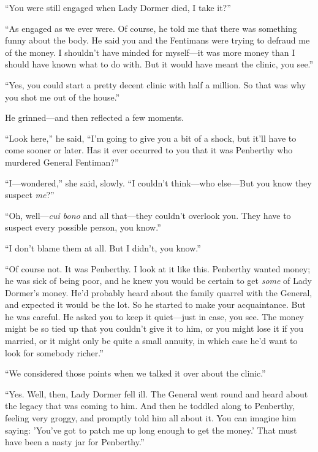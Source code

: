 \enquote{You were still engaged when Lady Dormer died, I take it?}

\enquote{As engaged as we ever were. Of course, he told me that there was something funny about the body. He said you and the Fentimans were trying to defraud me of the money. I shouldn't have minded for myself\allowbreak---\allowbreak it was more money than I should have known what to do with. But it would have meant the clinic, you see.}

\enquote{Yes, you could start a pretty decent clinic with half a million. So that was why you shot me out of the house.}

He grinned\allowbreak---\allowbreak and then reflected a few moments.

\enquote{Look here,} he said, \enquote{I'm going to give you a bit of a shock, but it'll have to come sooner or later. Has it ever occurred to you that it was Penberthy who murdered General Fentiman?}

\enquote{I\allowbreak---\allowbreak wondered,} she said, slowly. \enquote{I couldn't think\allowbreak---\allowbreak who else\allowbreak---\allowbreak But you know they suspect \textit{me}?}

\enquote{Oh, well---\textit{cui bono} and all that\allowbreak---\allowbreak they couldn't overlook you. They have to suspect every possible person, you know.}

\enquote{I don't blame them at all. But I didn't, you know.}

\enquote{Of course not. It was Penberthy. I look at it like this. Penberthy wanted money; he was sick of being poor, and he knew you would be certain to get \textit{some} of Lady Dormer's money. He'd probably heard about the family quarrel with the General, and expected it would be the lot. So he started to make your acquaintance. But he was careful. He asked you to keep it quiet\allowbreak---\allowbreak just in case, you see. The money might be so tied up that you couldn't give it to him, or you might lose it if you married, or it might only be quite a small annuity, in which case he'd want to look for somebody richer.}

\enquote{We considered those points when we talked it over about the clinic.}

\enquote{Yes. Well, then, Lady Dormer fell ill. The General went round and heard about the legacy that was coming to him. And then he toddled along to Penberthy, feeling very groggy, and promptly told him all about it. You can imagine him saying: 'You've got to patch me up long enough to get the money.' That must have been a nasty jar for Penberthy.}

